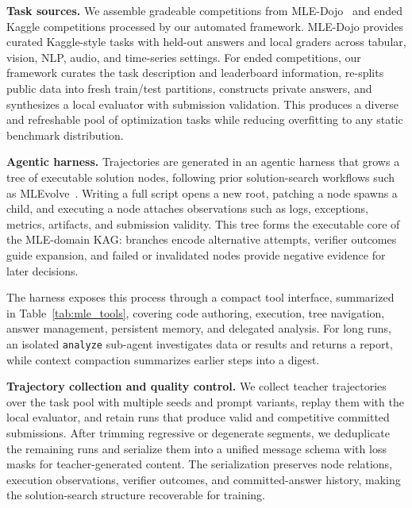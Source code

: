 \textbf{Task sources.}
We assemble gradeable competitions from MLE-Dojo~\citep{mledojo} and ended Kaggle competitions processed by our automated framework. MLE-Dojo provides curated Kaggle-style tasks with held-out answers and local graders across tabular, vision, NLP, audio, and time-series settings. For ended competitions, our framework curates the task description and leaderboard information, re-splits public data into fresh train/test partitions, constructs private answers, and synthesizes a local evaluator with submission validation. This produces a diverse and refreshable pool of optimization tasks while reducing overfitting to any static benchmark distribution.

\textbf{Agentic harness.}
Trajectories are generated in an agentic harness that grows a tree of executable solution nodes, following prior solution-search workflows such as MLEvolve~\citep{mlevolve}. Writing a full script opens a new root, patching a node spawns a child, and executing a node attaches observations such as logs, exceptions, metrics, artifacts, and submission validity. This tree forms the executable core of the MLE-domain KAG: branches encode alternative attempts, verifier outcomes guide expansion, and failed or invalidated nodes provide negative evidence for later decisions.

The harness exposes this process through a compact tool interface, summarized in Table~\ref{tab:mle_tools}, covering code authoring, execution, tree navigation, answer management, persistent memory, and delegated analysis. For long runs, an isolated \texttt{analyze} sub-agent investigates data or results and returns a report, while context compaction summarizes earlier steps into a digest.

\textbf{Trajectory collection and quality control.}
We collect teacher trajectories over the task pool with multiple seeds and prompt variants, replay them with the local evaluator, and retain runs that produce valid and competitive committed submissions. After trimming regressive or degenerate segments, we deduplicate the remaining runs and serialize them into a unified message schema with loss masks for teacher-generated content. The serialization preserves node relations, execution observations, verifier outcomes, and committed-answer history, making the solution-search structure recoverable for training.




